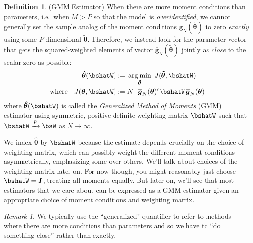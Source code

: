 \documentclass[12pt]{article}
\theoremstyle{plain}
\theoremstyle{definition}
\newtheorem{defn}[thm]{Definition}
\theoremstyle{remark}
\newtheorem*{rmk}{Remark}
\newcommand{\ra}{\rightarrow}
\newcommand{\bshattheta}{\boldsymbol{\hat{\theta}}}
\newcommand{\bstildetheta}{\boldsymbol{\tilde{\theta}}}
\newcommand{\bsbarg}{\boldsymbol{\overline{g}}}
\DeclareMathOperator*{\argmin}{arg\;min}
\newcommand{\pto}{\xrightarrow{P}}
\begin{document}
\begin{defn}(GMM Estimator)
\label{defn:gmm}
When there are more moment conditions than parameters, i.e.\ when $M>P$
so that the model is \emph{overidentified}, we cannot generally set the
sample analog of the moment conditions $\bsbarg_N(\bstildetheta)$ to zero
\emph{exactly} using some $P$-dimensional $\bstildetheta$.
Therefore, we instead look for the parameter vector that gets the
squared-weighted elements of vector $\bsbarg_N(\bstildetheta)$ jointly as
\emph{close} to the scalar zero as possible:
\begin{align}
  \bshattheta(\bshatW) :=&\;
  \argmin_{\bstildetheta} \; J(\bstildetheta,\bshatW)
  \label{eq:bhatmin} \\
  \text{where}\quad
  J(\bstildetheta,\bshatW)
  :=&\;
  N\cdot \bsbarg_N(\bstildetheta)' \, \bshatW \, \bsbarg_N(\bstildetheta)
  \notag
\end{align}
where $\bshattheta(\bshatW)$ is called
the \emph{Generalized Method of Moments} (GMM) estimator using
symmetric, positive definite weighting matrix $\bshatW$ such that
$\bshatW\pto \bsW$ as $N\ra\infty$.

We index $\bshattheta$ by $\bshatW$ because the estimate depends
crucially on the choice of weighting matrix, which can possibly weight
the different moment conditions asymmetrically, emphasizing some over
others.
We'll talk about choices of the weighting matrix
later on. For now though, you might reasonably just
choose $\bshatW=\boldsymbol{I}$, treating all moments
equally.
But later on, we'll see that most estimators that we care about can be
expressed as a GMM estimator given an appropriate choice of moment
conditions and weighting matrix.
\end{defn}


\begin{rmk}
We typically use the ``generalized'' quantifier to refer to methods
where there are more conditions than parameters and so we have to ``do
something close'' rather than exactly.
\end{rmk}
\end{document}
